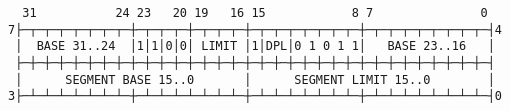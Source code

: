 \documentclass[varwidth=50em]{standalone}
\begin{document}
\begin{verbatim}
  31           24 23   20 19   16 15            8 7               0
7├─┬─┬─┬─┬─┬─┬─┬─┼─┬─┬─┬─┼─┬─┬─┬─┼─┬─┬─┬─┬─┬─┬─┬─┼─┬─┬─┬─┬─┬─┬─┬─┬─┤4
 │  BASE 31..24  │1│1│0│0│ LIMIT │1│DPL│0 1 0 1 1│   BASE 23..16   │
 ├─┼─┼─┼─┼─┼─┼─┼─┼─┼─┼─┼─┼─┼─┼─┼─┼─┼─┼─┼─┼─┼─┼─┼─┼─┼─┼─┼─┼─┼─┼─┼─┼─┤
 │      SEGMENT BASE 15..0       │      SEGMENT LIMIT 15..0        │
3├─┴─┴─┴─┴─┴─┴─┴─┼─┴─┴─┴─┴─┴─┴─┴─┼─┴─┴─┴─┴─┴─┴─┴─┼─┴─┴─┴─┴─┴─┴─┴─┴─┤0
\end{verbatim}
\end{document}

